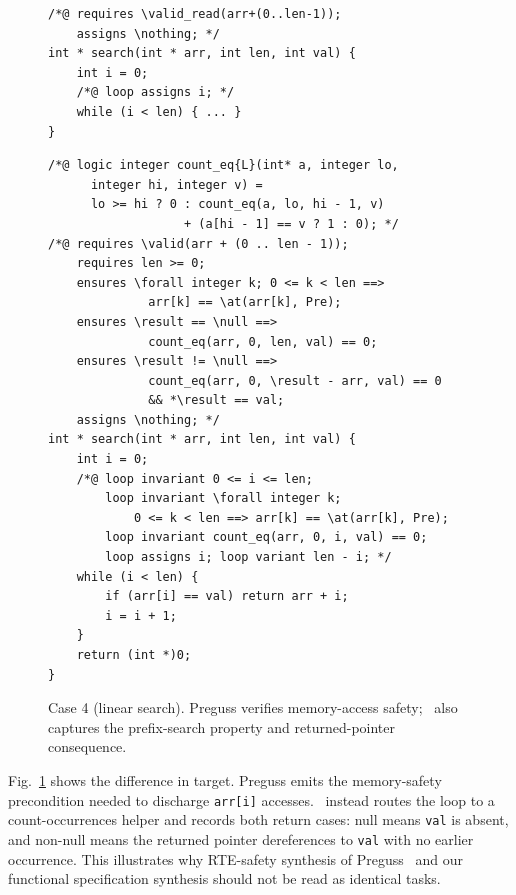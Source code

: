 \begin{figure}[!t]
  \centering
  \begin{tcolorbox}[casebox, title={Preguss: RTE-guided safety specification}, width=0.96\linewidth]
\begin{lstlisting}[style=casecompactinnerstyle]
/*@ requires \valid_read(arr+(0..len-1));
    assigns \nothing; */
int * search(int * arr, int len, int val) {
    int i = 0;
    /*@ loop assigns i; */
    while (i < len) { ... }
}
\end{lstlisting}
  \end{tcolorbox}
  \vspace{1.4ex}

  \begin{tcolorbox}[casebox, title={\toolname: verifier-checked prefix-search specification}, width=0.96\linewidth]
\begin{lstlisting}[style=casecompactinnerstyle]
/*@ logic integer count_eq{L}(int* a, integer lo,
      integer hi, integer v) =
      lo >= hi ? 0 : count_eq(a, lo, hi - 1, v)
                   + (a[hi - 1] == v ? 1 : 0); */
/*@ requires \valid(arr + (0 .. len - 1));
    requires len >= 0;
    ensures \forall integer k; 0 <= k < len ==>
              arr[k] == \at(arr[k], Pre);
    ensures \result == \null ==>
              count_eq(arr, 0, len, val) == 0;
    ensures \result != \null ==>
              count_eq(arr, 0, \result - arr, val) == 0
              && *\result == val;
    assigns \nothing; */
int * search(int * arr, int len, int val) {
    int i = 0;
    /*@ loop invariant 0 <= i <= len;
        loop invariant \forall integer k;
            0 <= k < len ==> arr[k] == \at(arr[k], Pre);
        loop invariant count_eq(arr, 0, i, val) == 0;
        loop assigns i; loop variant len - i; */
    while (i < len) {
        if (arr[i] == val) return arr + i;
        i = i + 1;
    }
    return (int *)0;
}
\end{lstlisting}
  \end{tcolorbox}
  \caption{Case 4 (linear search). Preguss verifies memory-access safety; \toolname\ also captures the prefix-search property and returned-pointer consequence.}
  \label{fig:case7}
\end{figure}

Fig.~\ref{fig:case7} shows the difference in target. Preguss emits the memory-safety precondition needed to discharge \texttt{arr[i]} accesses. \toolname\ instead routes the loop to a count-occurrences helper and records both return cases: null means \texttt{val} is absent, and non-null means the returned pointer dereferences to \texttt{val} with no earlier occurrence. This illustrates why RTE-safety synthesis of Preguss~\cite{Wang2025ATO} and our functional specification synthesis should not be read as identical tasks.

